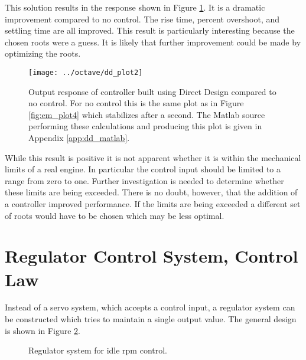 \documentclass{article}
\begin{document}
This solution results in the response shown in Figure \ref{fig:dd_plot2}.
It is a dramatic improvement compared to no control.
The rise time, percent overshoot, and settling time are all improved.
This result is particularly interesting because the chosen roots were a guess.
It is likely that further improvement could be made by optimizing the roots.

\begin{figure}[htbp!]
\begin{center}
\texttt{[image: ../octave/dd\_plot2]}
\end{center}
\caption{Output response of controller built using Direct Design
compared to no control.  For no control this is the same plot
as in Figure \ref{fig:em_plot4} which stabilizes after a second.
The Matlab source performing these calculations and producing this
plot is given in Appendix \ref{app:dd_matlab}.}
\label{fig:dd_plot2}
\end{figure}

While this result is positive it is not apparent whether it is within
the mechanical limits of a real engine.
In particular the control input should be limited to a range from zero to one.
Further investigation is needed to determine whether these limits
are being exceeded.
There is no doubt, however, that the addition of a controller
improved performance.
If the limits are being exceeded a different set of roots would have to
be chosen which may be less optimal.


\clearpage
\section{Regulator Control System, Control Law}

Instead of a servo system, which accepts a control input,
a regulator system can be constructed which tries to maintain
a single output value.  The general design is shown
in Figure \ref{fig:reg1}.

\begin{figure}[hbp!]
\begin{center}


\end{center}
\caption{Regulator system for idle rpm control.}\label{fig:reg1}
\end{figure}
\end{document}
